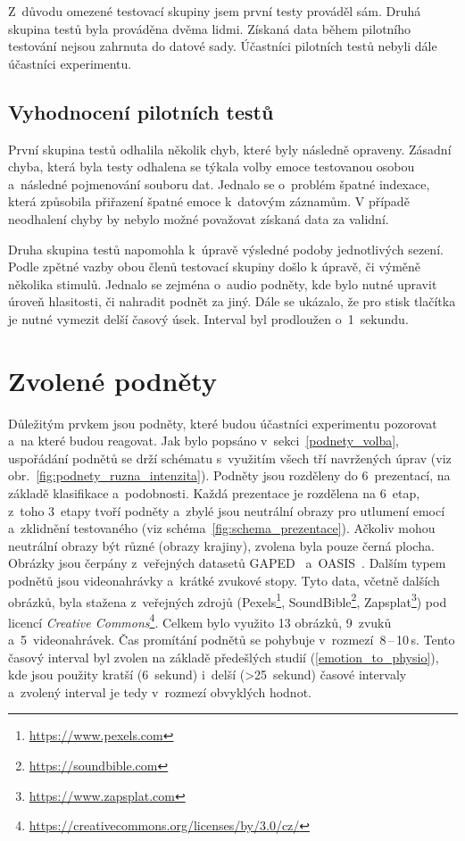     Z~důvodu omezené testovací skupiny jsem první testy prováděl sám. Druhá skupina testů byla prováděna dvěma lidmi. Získaná data během pilotního testování nejsou zahrnuta do datové sady. Účastníci pilotních testů nebyli dále účastníci experimentu.
    
    \subsection{Vyhodnocení pilotních testů}
    První skupina testů odhalila několik chyb, které byly následně opraveny. Zásadní chyba, která byla testy odhalena se týkala volby emoce testovanou osobou a~následné pojmenování souboru dat. Jednalo se o~problém špatné indexace, která způsobila přiřazení špatné emoce k~datovým záznamům. V případě neodhalení chyby by nebylo možné považovat získaná data za validní.
    
    Druha skupina testů napomohla k~úpravě výsledné podoby jednotlivých sezení. Podle zpětné vazby obou členů testovací skupiny došlo k úpravě, či výměně několika stimulů. Jednalo se zejména o~audio podněty, kde bylo nutné upravit úroveň hlasitosti, či nahradit podnět za jiný. Dále se ukázalo, že pro stisk tlačítka je nutné vymezit delší časový úsek. Interval byl prodloužen o~1~sekundu.
    
    
    \section{Zvolené podněty}
    Důležitým prvkem jsou podněty, které budou účastníci experimentu pozorovat a~na které budou reagovat. Jak bylo popsáno v~sekci~\ref{podnety_volba}, uspořádání podnětů se drží schématu s~využitím všech tří navržených úprav (viz obr.~\ref{fig:podnety_ruzna_intenzita}). Podněty jsou rozděleny do 6~prezentací, na základě klasifikace a~podobnosti. Každá prezentace je rozdělena na 6~etap, z~toho 3~etapy tvoří podněty a~zbylé jsou neutrální obrazy pro utlumení emocí a~zklidnění testovaného (viz schéma~\ref{fig:schema_prezentace}). Ačkoliv mohou neutrální obrazy být různé (obrazy krajiny), zvolena byla pouze černá plocha. Obrázky jsou čerpány z~veřejných datasetů GAPED~\cite{gaped} a~OASIS~\cite{oasis}. Dalším typem podnětů jsou videonahrávky a~krátké zvukové stopy. Tyto data, včetně dalších obrázků, byla stažena z~veřejných zdrojů (Pexels\footnote{\url{https://www.pexels.com}}, SoundBible\footnote{\url{https://soundbible.com}}, Zapsplat\footnote{\url{https://www.zapsplat.com}}) pod licencí \emph{Creative Commons}\footnote{\url{https://creativecommons.org/licenses/by/3.0/cz/}}. Celkem bylo využito 13 obrázků, 9~zvuků a~5~videonahrávek. Čas promítání podnětů se pohybuje v~rozmezí~8\,--\,10\,s. Tento časový interval byl zvolen na základě předešlých studií (\ref{emotion_to_physio}), kde jsou použity kratší (6~sekund) i~delší (>25~sekund) časové intervaly a~zvolený interval je tedy v~rozmezí obvyklých hodnot.
    
